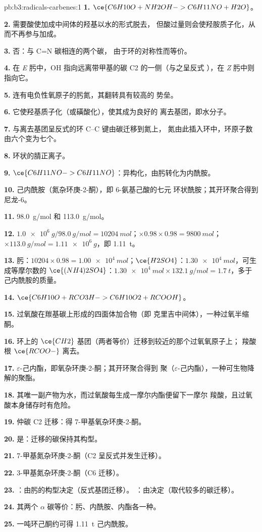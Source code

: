 \begin{solution}{pb:b3:radicals-carbenes:1}
\textbf{1.} $\ce{C6H10O + NH2OH -> C6H11NO + H2O}$。

\textbf{2.} 需要酸使加成中间体的羟基以水的形式脱去，
但酸过量则会使羟胺质子化，从而不再参与加成。

\textbf{3.} 否：与 C=N 碳相连的两个碳，
由于环的对称性而等价。

\textbf{4.} 在 \textit{E} 肟中，OH 指向远离带甲基的碳 C2 的一侧（与之呈反式
），在 \textit{Z} 肟中则指向它。

\textbf{5.} 连有电负性氧原子的肟氮，其翻转具有较高的
势垒。

\textbf{6.} 它使羟基质子化（或磺酸化），使其成为良好的
离去基团，即水分子。

\textbf{7.} 与离去基团呈反式的环 C--C 键由碳迁移到氮上，
氮由此插入环中，环原子数由六个变为七个。

\textbf{8.} 环状的腈正离子。

\textbf{9.} $\ce{C6H11NO -> C6H11NO}$：异构化，由肟转化为内酰胺。

\textbf{10.} 己内酰胺（氮杂环庚-2-酮），即 6-氨基己酸的七元
环状酰胺；其开环聚合得到尼龙-6。

\textbf{11.} \qty{98.0}{g/mol} 和 \qty{113.0}{g/mol}。

\textbf{12.} $\qty{1.0e6}{g}/\qty{98.0}{g/mol} = \qty{10204}{mol}$；$\times 0.98 \times 0.98 = \qty{9800}{mol}$；$\times \qty{113.0}{g/mol} = \qty{1.11e6}{g}$，即 \qty{1.11}{t}。

\textbf{13.} 肟：$\num{10204} \times 0.98 = \qty{1.00e4}{mol}$；$\ce{H2SO4}$：$\qty{1.30e4}{mol}$，可生成等摩尔数的
$\ce{(NH4)2SO4}$：$\qty{1.30e4}{mol} \times \qty{132.1}{g/mol} = \qty{1.7}{t}$，多于己内酰胺的质量。

\textbf{14.} $\ce{C6H10O + RCO3H -> C6H10O2 + RCOOH}$。

\textbf{15.} 过氧酸在羰基碳上形成的四面体加合物（即
克里吉中间体），一种过氧半缩酮。

\textbf{16.} 环上的 $\ce{CH2}$ 基团（两者等价）迁移到较近的那个过氧氧原子上；
羧酸根 $\ce{RCOO-}$ 离去。

\textbf{17.} $\varepsilon$-己内酯，即氧杂环庚-2-酮；其开环聚合得到
聚（$\varepsilon$-己内酯），一种可生物降解的聚酯。

\textbf{18.} 其唯一副产物为水，而过氧酸每生成一摩尔内酯便留下一摩尔
羧酸，且过氧酸本身储存时有危险。

\textbf{19.} 仲碳 C2 迁移：得 7-甲基氧杂环庚-2-酮。

\textbf{20.} 是：迁移的碳保持其构型。

\textbf{21.} 7-甲基氮杂环庚-2-酮（C2 呈反式并发生迁移）。

\textbf{22.} 3-甲基氮杂环庚-2-酮（C6 迁移）。

\textbf{23.} ：由肟的构型决定（反式基团迁移）。
：由决定（取代较多的碳迁移）。

\textbf{24.} 其两个 $\alpha$ 碳等价：肟、内酰胺、内酯各一种。

\textbf{25.} 一吨环己酮约可得 \qty{1.11}{t} 己内酰胺。
\end{solution}
